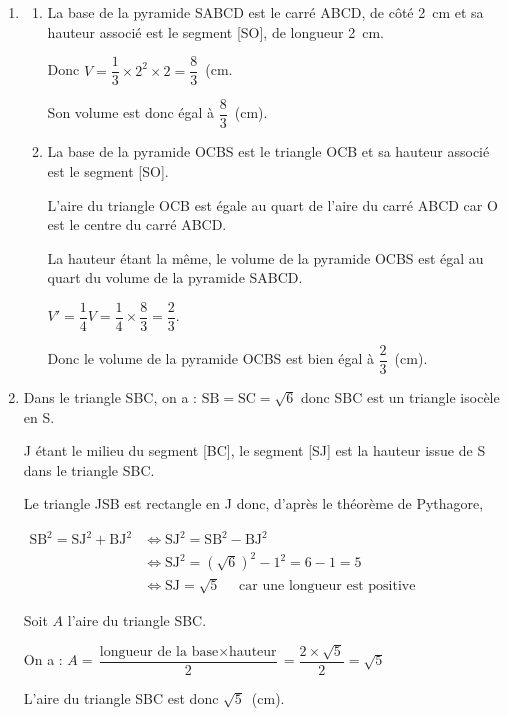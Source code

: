 \begin{enumerate}
\item
	\begin{enumerate}
			\item La base de la pyramide SABCD est le carré ABCD, de côté 2~cm et sa hauteur associé est le segment [SO], de longueur 2~cm.

Donc $V= \dfrac{1}{3} \times 2^2\times 2 = \dfrac{8}{3}$~(cm.

Son volume est donc égal à \quad $\dfrac{8}{3}$~(cm).

			\item La base de la pyramide OCBS est le triangle OCB et sa hauteur associé est le segment [SO].

L'aire du triangle OCB est égale au quart de l'aire du carré ABCD car O est le centre du carré ABCD.

La hauteur étant la même, le volume de la pyramide OCBS est égal au quart du volume de la pyramide SABCD.

$V'= \dfrac{1}{4} V = \dfrac{1}{4} \times \dfrac{8}{3} = \dfrac{2}{3}$.

Donc le volume de la pyramide OCBS est bien égal à $\dfrac{2}{3}$~(cm).
	\end{enumerate}

		\item Dans le triangle SBC, on a : \quad $\mathrm{SB} = \mathrm{SC} = \sqrt{6}$ \quad donc SBC est un triangle isocèle en S.

J étant le milieu du segment [BC], le segment [SJ] est la hauteur issue de S dans le triangle SBC.

Le triangle JSB est rectangle en J donc, d'après le théorème de Pythagore,

$\begin{aligned} \mathrm{SB}^2 = \mathrm{SJ}^2+ \mathrm{BJ}^2 & \iff
\mathrm{SJ}^2 = \mathrm{SB}^2- \mathrm{BJ}^2 \\
	& \iff \mathrm{SJ}^2 = \left(\sqrt{6}\right)^2- 1^2= 6-1=5\\
	& \iff	\mathrm{SJ}=\sqrt{5} \quad \text{ car une longueur est positive}
\end{aligned}$

Soit $A$ l'aire du triangle SBC.

On a : \quad $A= \dfrac{\text{longueur de la base} \times \text{hauteur}}{2} = \dfrac{2 \times \sqrt{5}}{2}= \sqrt{5}$

L'aire du triangle SBC est donc $\sqrt{5}$~(cm).


\end{enumerate}
